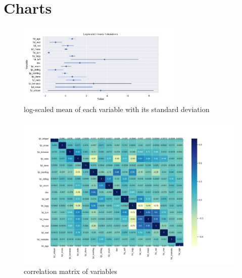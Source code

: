 \documentclass[12p]{article}
\begin{document}
\section{Charts}

\begin{figure}[!ht]\centering
    \includegraphics[angle=90, width=0.7\textwidth]{graphics/mean_deviation.pdf}
    \caption{log-scaled mean of each variable with its standard deviation}
    \label{pic:mean}
\end{figure}

\begin{figure}[!ht]\centering
    \includegraphics[angle=90, width=1\textwidth]{graphics/correlation_matrix.pdf}
    \caption{correlation matrix of variables}
    \label{pic:corr}
\end{figure}
\end{document}
